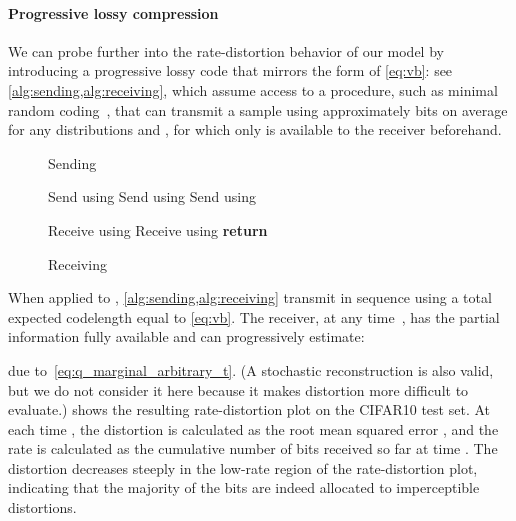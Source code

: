 \documentclass{article}
\begin{document}
\paragraph{Progressive lossy compression} We can probe further into the rate-distortion behavior of our model by introducing a progressive lossy code that mirrors the form of \cref{eq:vb}: see \cref{alg:sending,alg:receiving}, which assume access to a procedure, such as minimal random coding~\citep{harsha2007communication,havasi2018minimal}, that can transmit a sample  using approximately  bits on average for any distributions  and , for which only  is available to the receiver beforehand.
\begin{figure}[t]
\begin{minipage}[t]{0.55\textwidth}
\begin{algorithm}[H]
 \caption{Sending } \label{alg:sending}
 \small
 \begin{algorithmic}[1]
    \State Send  using 
    \For{}
     \State Send  using 
    \EndFor
    \State Send  using 
 \end{algorithmic}
\end{algorithm}
\end{minipage}
\hfill
\begin{minipage}[t]{0.44\textwidth}
\begin{algorithm}[H]
 \caption{Receiving} \label{alg:receiving}
 \small
 \begin{algorithmic}[1]
 \vspace{.01in}
    \State Receive  using 
    \For{}
     \State Receive  using 
    \EndFor
    \State \textbf{return} 
    \vspace{.01in}
 \end{algorithmic}
\end{algorithm}
\end{minipage}
\vspace{-1em}
\end{figure}
When applied to , \cref{alg:sending,alg:receiving} transmit  in sequence using a total expected codelength equal to \cref{eq:vb}. The receiver, at any time~, has the partial information  fully available and can progressively estimate:

due to~\cref{eq:q_marginal_arbitrary_t}.
(A stochastic reconstruction  is also valid, but we do not consider it here because it makes distortion more difficult to evaluate.)
 shows the resulting rate-distortion plot on the CIFAR10 test set. At each time , the distortion is calculated as the root mean squared error , and the rate is calculated as the cumulative number of bits received so far at time . The distortion decreases steeply in the low-rate region of the rate-distortion plot, indicating that the majority of the bits are indeed allocated to imperceptible distortions.
\end{document}
